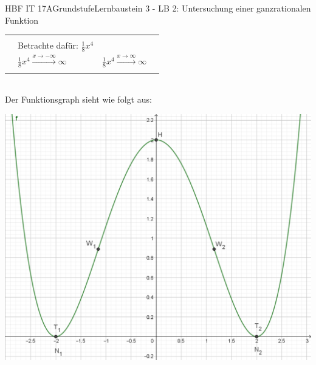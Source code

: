 \documentclass[oneside,openany,headings=optiontotoc,11pt,numbers=noenddot]{scrreprt}
\begin{document}
\begin{worksheet}{HBF IT 17A}{Grundstufe}{Lernbaustein 3 - LB 2: Untersuchung einer ganzrationalen Funktion}
\begin{framed}
\begin{tabularx}{\textwidth}{lXXl}
				\hline\\
				& Betrachte dafür: \(\frac{1}{8}x^4\)\\
				& \colorbox{green!10}{\(\frac{1}{8}x^4\xrightarrow{x\rightarrow-\infty}\infty\)} & \colorbox{green!10}{\(\frac{1}{8}x^4\xrightarrow{x\rightarrow\infty}\infty\)}\\
				\hline\hline\\
			\end{tabularx}\\
			Der Funktionsgraph sieht wie folgt aus:\\
			\par
			\includegraphics[scale=0.35]{Bilder/HAf.png}\\
		\end{framed}
	\end{worksheet}
\end{document}
